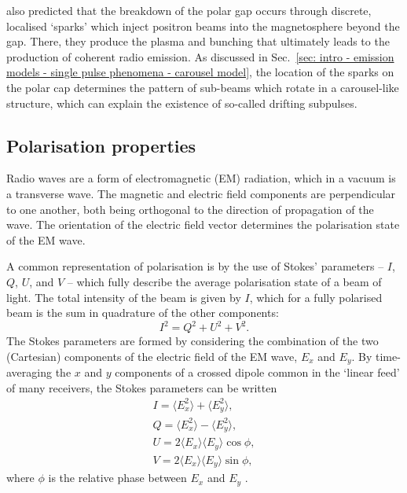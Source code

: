 \citet{RSxx1975} also predicted that the breakdown of the polar gap occurs through discrete, localised `sparks' which inject positron beams into the magnetosphere beyond the gap. There, they produce the plasma and bunching that ultimately leads to the production of coherent radio emission. As discussed in Sec.~\ref{sec: intro - emission models - single pulse phenomena - carousel model}, the location of the sparks on the polar cap determines the pattern of sub-beams which rotate in a carousel-like structure, which can explain the existence of so-called drifting subpulses.



\subsection{Polarisation properties}
\label{sec: intro - emission models - polarisation}

Radio waves are a form of electromagnetic (EM) radiation, which in a vacuum is a transverse wave. The magnetic and electric field components are perpendicular to one another, both being orthogonal to the direction of propagation of the wave. The orientation of the electric field vector determines the polarisation state of the EM wave.

A common representation of polarisation is by the use of Stokes' parameters -- $I$, $Q$, $U$, and $V$ -- which fully describe the average polarisation state of a beam of light. The total intensity of the beam is given by $I$, which for a fully polarised beam is the sum in quadrature of the other components:
\begin{equation}
    \label{eq: stokes parameters quadrature}
    I^2 = Q^2 + U^2 + V^2.   
\end{equation}
The Stokes parameters are formed by considering the combination of the two (Cartesian) components of the electric field of the EM wave, $E_x$ and $E_y$. By time-averaging the $x$ and $y$ components of a crossed dipole common in the `linear feed' of many receivers, the Stokes parameters can be written
\begin{align}
    I = \langle E_x^2 \rangle + \langle E_y^2 \rangle, \label{eq: intro - stokes I linear}\\
    Q = \langle E_x^2 \rangle - \langle E_y^2 \rangle, \label{eq: intro - stokes Q linear}\\
    U = 2\langle E_x\rangle \langle E_y\rangle \cos\phi, \label{eq: intro - stokes U linear}\\
    V = 2\langle E_x\rangle \langle E_y \rangle \sin\phi, \label{eq: intro - stokes V linear}
\end{align}  
where $\phi$ is the relative phase between $E_x$ and $E_y$ \citep{Handbook}.

